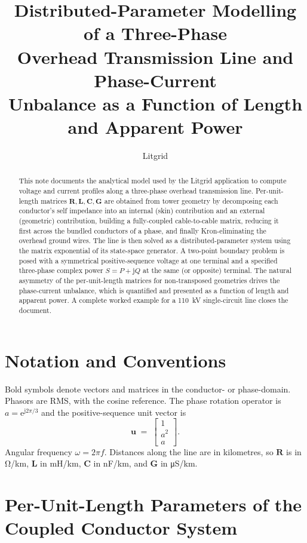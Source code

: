 \documentclass[11pt,a4paper]{article}
\title{Distributed-Parameter Modelling of a Three-Phase\\
Overhead Transmission Line and Phase-Current\\
Unbalance as a Function of Length and Apparent Power}
\author{Litgrid}
\date{}
\newcommand{\jj}{\mathrm{j}}
\newcommand{\ee}{\mathrm{e}}
\newcommand{\matR}{\bm{R}}
\newcommand{\matL}{\bm{L}}
\newcommand{\matC}{\bm{C}}
\newcommand{\matG}{\bm{G}}
\newcommand{\vu}{\bm{u}}
\begin{document}
\maketitle

\begin{abstract}
This note documents the analytical model used by the Litgrid application to
compute voltage and current profiles along a three-phase overhead transmission
line. Per-unit-length matrices \(\matR,\matL,\matC,\matG\) are obtained from
tower geometry by decomposing each conductor's self impedance into an internal
(skin) contribution and an external (geometric) contribution, building a
fully-coupled cable-to-cable matrix, reducing it first across the bundled
conductors of a phase, and finally Kron-eliminating the overhead ground wires.
The line is then solved as a distributed-parameter system using the matrix
exponential of its state-space generator. A two-point boundary problem is
posed with a symmetrical positive-sequence voltage at one terminal and a
specified three-phase complex power \(S=P+\jj Q\) at the same (or opposite)
terminal. The natural asymmetry of the per-unit-length matrices for
non-transposed geometries drives the phase-current unbalance, which is
quantified and presented as a function of length and apparent power. A
complete worked example for a \SI{110}{\kilo\volt} single-circuit line closes
the document.
\end{abstract}

\section{Notation and Conventions}

Bold symbols denote vectors and matrices in the conductor- or phase-domain.
Phasors are RMS, with the cosine reference. The phase rotation operator is
\(a = \ee^{\jj 2\pi/3}\) and the positive-sequence unit vector is
\begin{equation}
\vu \;=\; \begin{bmatrix} 1 \\ a^{2} \\ a \end{bmatrix}.
\label{eq:u}
\end{equation}
Angular frequency \(\omega=2\pi f\). Distances along the line are in
kilometres, so \(\matR\) is in \si{\ohm/\kilo\metre}, \(\matL\) in
\si{\milli\henry/\kilo\metre}, \(\matC\) in \si{\nano\farad/\kilo\metre}, and
\(\matG\) in \si{\micro\siemens/\kilo\metre}.

\section{Per-Unit-Length Parameters of the Coupled Conductor System}
\end{document}
